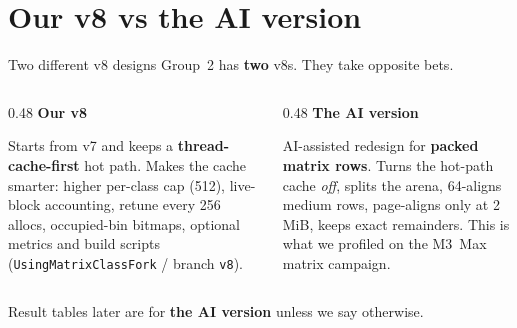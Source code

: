 \section{Our v8 vs the AI version}

\begin{frame}{Two different v8 designs}
    Group~2 has \textbf{two} v8s. They take opposite bets.

    \vspace{0.55em}
    \begin{columns}[T]
        \begin{column}{0.48\textwidth}
            {\large\textbf{Our v8}}

            \vspace{0.35em}
            {\footnotesize
            Starts from v7 and keeps a
            \textbf{thread-cache-first} hot path.
            Makes the cache smarter: higher
            per-class cap (512), live-block
            accounting, retune every 256 allocs,
            occupied-bin bitmaps, optional metrics
            and build scripts
            (\texttt{UsingMatrixClassFork} /
            branch \texttt{v8}).
            }
        \end{column}
        \begin{column}{0.48\textwidth}
            {\large\textbf{The AI version}}

            \vspace{0.35em}
            {\footnotesize
            AI-assisted redesign for
            \textbf{packed matrix rows}.
            Turns the hot-path cache \emph{off},
            splits the arena, 64-aligns medium
            rows, page-aligns only at 2\,MiB,
            keeps exact remainders.
            This is what we profiled on the
            M3~Max matrix campaign.
            }
        \end{column}
    \end{columns}

    \vspace{0.7em}
    {\footnotesize Result tables later are for \textbf{the AI version}
    unless we say otherwise.}
\end{frame}


